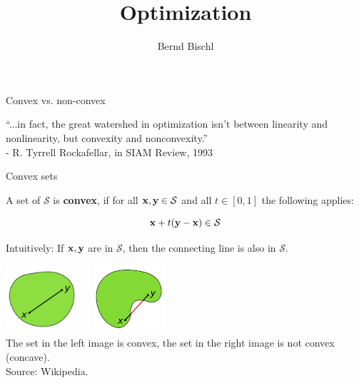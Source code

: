





\newcommand{\titlefigure}{figure_man/hinge_vs_l2.pdf}
\newcommand{\learninggoals}{
\item TODO
\item TODO}



\title{Optimization}
\author{Bernd Bischl}
\date{}



\sloppy


\begin{vbframe}{Convex vs. non-convex}

\vspace*{2cm}

\begin{center}
\Large{\enquote{...in fact, the great watershed in optimization isn't between linearity and nonlinearity, but convexity and nonconvexity.}}\\
\normalsize - R. Tyrrell Rockafellar, in SIAM Review, 1993
\end{center}

	
\end{vbframe}

\begin{vbframe}{Convex sets}

A set of $\mathcal{S}$ is \textbf{convex}, if for all $\mathbf{x}, \mathbf{y} \in \mathcal{S}$ and all $t \in [0, 1]$ the following applies:

$$
\mathbf{x} + t (\mathbf{y} - \mathbf{x}) \in \mathcal{S}
$$

Intuitively: If $\mathbf{x}, \mathbf{y}$ are in $\mathcal{S}$, then the connecting line is also in $\mathcal{S}$.

\begin{center}
\includegraphics[width = 0.2\textwidth]{figure_man/convex.png}~~~\includegraphics[width = 0.2\textwidth]{figure_man/concave.png} \\
\footnotesize{The set in the left image is convex, the set in the right image is not convex (concave). \\
Source: Wikipedia. 
}
\end{center}

\end{vbframe}

